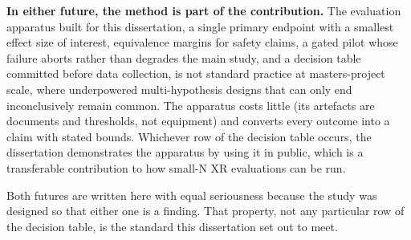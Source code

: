 \textbf{In either future, the method is part of the contribution.} The evaluation apparatus built for
this dissertation, a single primary endpoint with a smallest effect size of interest, equivalence
margins for safety claims, a gated pilot whose failure aborts rather than degrades the main study,
and a decision table committed before data collection, is not standard practice at
masters-project scale, where underpowered multi-hypothesis designs that can only end inconclusively
remain common. The apparatus costs little (its artefacts are documents and thresholds, not
equipment) and converts every outcome into a claim with stated bounds. Whichever row of the
decision table occurs, the dissertation demonstrates the apparatus by using it in public, which is
a transferable contribution to how small-N XR evaluations can be run.

Both futures are written here with equal seriousness because the study was designed so that either
one is a finding. That property, not any particular row of the decision table, is the standard
this dissertation set out to meet.
